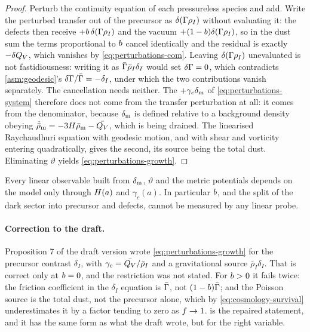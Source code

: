 \begin{proof}
  Perturb the continuity equation of each pressureless species and add. Write
  the perturbed transfer out of the precursor as $\delta(\Gamma\rho_{I})$ without
  evaluating it: the defects then receive $+b\,\delta(\Gamma\rho_{I})$ and the
  vacuum $+(1-b)\delta(\Gamma\rho_{I})$, so in the dust sum the terms
  proportional to $b$ cancel identically and the residual is exactly
  $-\delta Q_{V}$, which vanishes by \cref{eq:perturbations-com}. Leaving
  $\delta(\Gamma\rho_{I})$ unevaluated is not fastidiousness: writing it as
  $\bar{\Gamma}\bar\rho_I\delta_I$ would set $\delta\Gamma=0$, which contradicts
  \cref{asm:geodesic}'s $\delta\Gamma/\bar{\Gamma}=-\delta_I$, under which the two
  contributions vanish separately. The cancellation needs neither. The
  $+\gamma_c\delta_{\rm m}$ of \cref{eq:perturbations-system} therefore does not
  come from the transfer perturbation at all: it comes from the denominator,
  because $\delta_{\rm m}$ is defined relative to a background density obeying
  $\dot{\bar\rho}_{\rm m}=-3H\bar\rho_{\rm m}-\bar {Q_{V}}$, which is being
  drained. The linearised Raychaudhuri
  equation with geodesic motion, and with shear and vorticity entering
  quadratically, gives the second, its source being the total dust.
  Eliminating $\vartheta$ yields \cref{eq:perturbations-growth}.
\end{proof}

\begin{corollary}\label{cor:b-invisible}
  Every linear observable built from $\delta_{\rm m}$, $\vartheta$ and the
  metric potentials depends on the model only through $H(a)$ and
  $\gamma_c(a)$. In particular $b$, and the split of the dark sector into
  precursor and defects, cannot be measured by any linear probe.
\end{corollary}

\paragraph{Correction to the draft.} Proposition 7 of the draft version wrote
\cref{eq:perturbations-growth} for the precursor contrast $\delta_I$, with
$\gamma_c=\bar {Q_{V}}/\bar\rho_I$ and a gravitational source $\bar\rho_I\delta_I$.
That is correct only at $b=0$, and the restriction was not stated. For
$b>0$ it fails twice: the friction coefficient in the $\delta_I$ equation
is $\bar{\Gamma}$, not $(1-b)\bar{\Gamma}$; and the Poisson source is the total
dust, not the precursor alone, which by
\cref{eq:cosmology-survival} underestimates it by a factor tending to zero as
$f\to1$.  is the repaired statement, and it has
the same form as what the draft wrote, but for the right variable.

